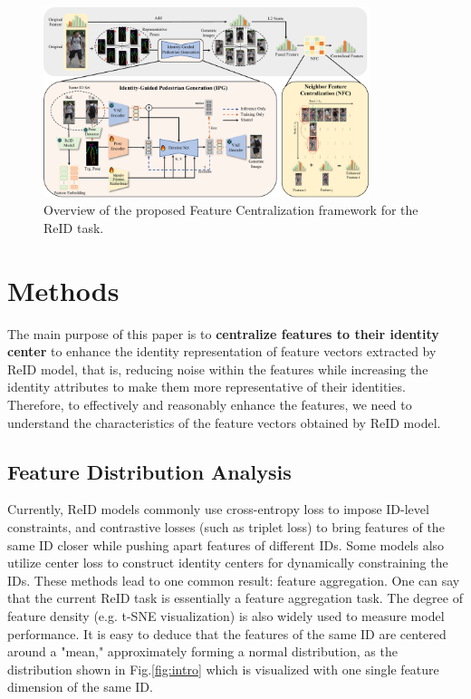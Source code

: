\begin{figure}
\centering
\includegraphics[width=0.85\textwidth]{figs/pdf/main.pdf}
\caption{Overview of the proposed Feature Centralization framework for the ReID task.}
\label{fig:main}
\end{figure}

\section{Methods}
The main purpose of this paper is to \textbf{centralize features to their identity center} to enhance the identity representation of feature vectors extracted by ReID model, that is, reducing noise within the features while increasing the identity attributes to make them more representative of their identities. Therefore, to effectively and reasonably enhance the features, we need to understand the characteristics of the feature vectors obtained by ReID model.


\subsection{Feature Distribution Analysis} \label{Feature Distribution}

Currently, ReID models commonly use cross-entropy loss to impose ID-level constraints, and contrastive losses (such as triplet loss) to bring features of the same ID closer while pushing apart features of different IDs. Some models also utilize center loss to construct identity centers for dynamically constraining the IDs. These methods lead to one common result: feature aggregation. One can say that the current ReID task is essentially a feature aggregation task. The degree of feature density (e.g. t-SNE visualization) is also widely used to measure model performance. It is easy to deduce that the features of the same ID are centered around a "mean," approximately forming a normal distribution, as the distribution shown in Fig.\ref{fig:intro} which is visualized with one single feature dimension of the same ID.

